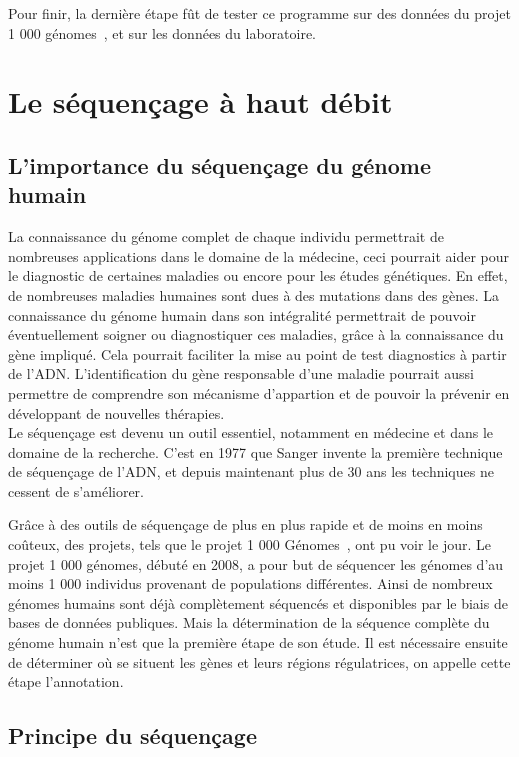 \documentclass[a4paper,12pt]{article}
\begin{document}
Pour finir, la dernière étape fût de tester ce programme sur des données du projet 1 000 génomes~\cite{1000Genomes}, et sur les données du laboratoire.


\section{Le séquençage à haut débit}

\subsection{L'importance du séquençage du génome humain}

La connaissance du génome complet de chaque individu permettrait de nombreuses applications dans le domaine de la médecine, ceci pourrait aider pour le diagnostic de certaines maladies ou encore pour les études génétiques. En effet, de  nombreuses maladies humaines sont dues à des mutations dans des gènes. La connaissance du génome humain dans son intégralité permettrait de pouvoir éventuellement soigner ou diagnostiquer ces maladies, grâce à la connaissance du gène impliqué. Cela pourrait faciliter la mise au point de test diagnostics à partir de l'ADN. L'identification du gène responsable d'une maladie pourrait aussi permettre de comprendre son mécanisme d'appartion et de pouvoir la prévenir en développant de nouvelles thérapies. \\

Le séquençage est devenu un outil essentiel, notamment en médecine et dans le domaine de la recherche. C'est en 1977 que Sanger invente la première technique de séquençage de l'ADN, et depuis maintenant plus de 30 ans les techniques ne cessent de s'améliorer. 

Grâce à des outils de séquençage de plus en plus rapide et de moins en moins coûteux, des projets, tels que le projet 1 000 Génomes~\cite{1000Genomes}, ont pu voir le jour. Le projet 1 000 génomes, débuté en 2008, a pour but de séquencer les génomes d'au moins 1 000 individus provenant de populations différentes. Ainsi de nombreux génomes humains sont déjà complètement séquencés et disponibles par le biais de bases de données publiques. Mais la détermination de la séquence complète du génome humain n'est que la première étape de son étude. Il est nécessaire ensuite de déterminer où se situent les gènes et leurs régions régulatrices, on appelle cette étape l'annotation. 

\subsection{Principe du séquençage }
\end{document}
